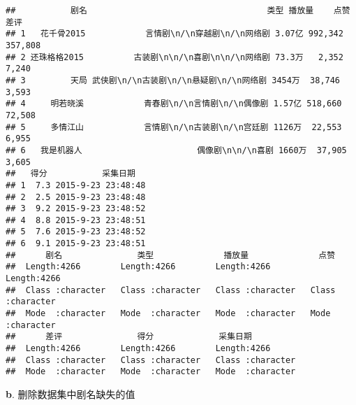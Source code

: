 \documentclass[
]{article}
\newenvironment{Shaded}{\begin{snugshade}}{\end{snugshade}}
\newcommand{\CommentTok}[1]{\textcolor[rgb]{0.56,0.35,0.01}{\textit{#1}}}
\newcommand{\ErrorTok}[1]{\textcolor[rgb]{0.64,0.00,0.00}{\textbf{#1}}}
\newcommand{\FunctionTok}[1]{\textcolor[rgb]{0.13,0.29,0.53}{\textbf{#1}}}
\newcommand{\NormalTok}[1]{#1}
\newcommand{\OtherTok}[1]{\textcolor[rgb]{0.56,0.35,0.01}{#1}}
\newcommand{\SpecialCharTok}[1]{\textcolor[rgb]{0.81,0.36,0.00}{\textbf{#1}}}
\newcommand{\StringTok}[1]{\textcolor[rgb]{0.31,0.60,0.02}{#1}}
\begin{document}
\begin{verbatim}
##           剧名                                    类型 播放量    点赞    差评
## 1   花千骨2015            言情剧\n/\n穿越剧\n/\n网络剧 3.07亿 992,342 357,808
## 2 还珠格格2015          古装剧\n\n/\n喜剧\n\n/\n网络剧 73.3万   2,352   7,240
## 3         天局 武侠剧\n/\n古装剧\n/\n悬疑剧\n/\n网络剧 3454万  38,746   3,593
## 4     明若晓溪            青春剧\n/\n言情剧\n/\n偶像剧 1.57亿 518,660  72,508
## 5     多情江山            言情剧\n/\n古装剧\n/\n宫廷剧 1126万  22,553   6,955
## 6   我是机器人                       偶像剧\n\n/\n喜剧 1660万  37,905   3,605
##   得分           采集日期
## 1  7.3 2015-9-23 23:48:48
## 2  2.5 2015-9-23 23:48:48
## 3  9.2 2015-9-23 23:48:52
## 4  8.8 2015-9-23 23:48:51
## 5  7.6 2015-9-23 23:48:52
## 6  9.1 2015-9-23 23:48:51
##      剧名               类型              播放量              点赞          
##  Length:4266        Length:4266        Length:4266        Length:4266       
##  Class :character   Class :character   Class :character   Class :character  
##  Mode  :character   Mode  :character   Mode  :character   Mode  :character  
##      差评               得分             采集日期        
##  Length:4266        Length:4266        Length:4266       
##  Class :character   Class :character   Class :character  
##  Mode  :character   Mode  :character   Mode  :character
\end{verbatim}

\textbf{b}. 删除数据集中剧名缺失的值

\begin{Shaded}
\end{Shaded}
\end{document}
